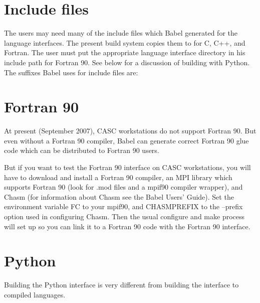 \section{Include files}

The users may need many of the include files which Babel generated for the language
interfaces.  The present build system copies them to
 for C, C++, and Fortran.  The user must put the
appropriate language interface directory in his include path for
Fortran 90.  See below for a discussion of building with Python.
 The suffixes Babel uses for include files are:
\begin{list}{.}{\setlength{\itemsep}{0in}}
\item {}
\item {}
\item {}
\item {}
\end{list}

\section{Fortran 90}

At present (September 2007), CASC workstations do not support Fortran
90.  But even without a Fortran 90 compiler, Babel can generate
correct Fortran 90 glue code which can be distributed to Fortran 90
users.

But if you want to test the Fortran 90 interface on CASC workstations,
you will have to download and install a Fortran 90 compiler, an MPI
library which supports Fortran 90 (look for .mod files and a mpif90
compiler wrapper), and Chasm (for information about Chasm see the
Babel Users' Guide).  Set the environment variable FC to your mpif90,
and CHASMPREFIX to the --prefix option used in configuring Chasm.
Then the usual configure and make process will set up \hypre{} so you
can link it to a Fortran 90 code with the Fortran 90 interface.

\section{Python}

Building the Python interface is very different from building the
interface to compiled languages.

